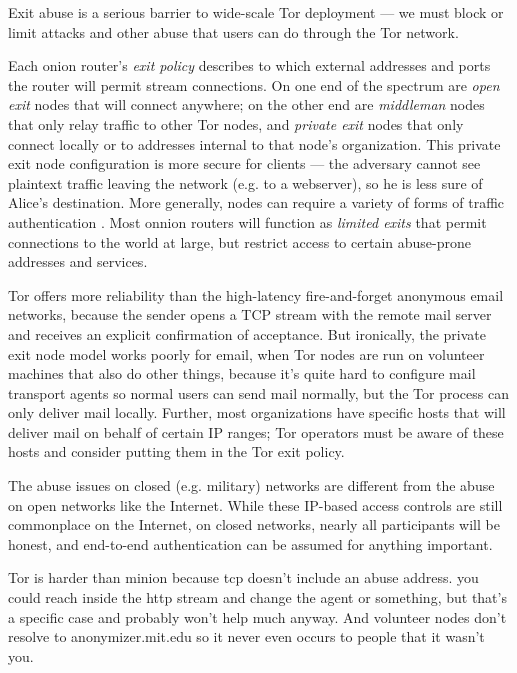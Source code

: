 \documentclass[times,10pt,twocolumn]{article}
\begin{document}
\label{subsec:exitpolicies}

Exit abuse is a serious barrier to wide-scale Tor deployment --- we
must block or limit attacks and other abuse that users can do through
the Tor network.

Each onion router's \emph{exit policy} describes to which external
addresses and ports the router will permit stream connections. On one end
of the spectrum are \emph{open exit} nodes that will connect anywhere;
on the other end are \emph{middleman} nodes that only relay traffic to
other Tor nodes, and \emph{private exit} nodes that only connect locally
or to addresses internal to that node's organization. 
This private exit
node configuration is more secure for clients --- the adversary cannot
see plaintext traffic leaving the network (e.g. to a webserver), so he
is less sure of Alice's destination. More generally, nodes can require
a variety of forms of traffic authentication \cite{onion-discex00}.
Most onnion routers will function as \emph{limited exits} that permit
connections to the world at large, but restrict access to certain abuse-prone
addresses and services.

Tor offers more reliability than the high-latency fire-and-forget
anonymous email networks, because the sender opens a TCP stream
with the remote mail server and receives an explicit confirmation of
acceptance. But ironically, the private exit node model works poorly for
email, when Tor nodes are run on volunteer machines that also do other
things, because it's quite hard to configure mail transport agents so
normal users can send mail normally, but the Tor process can only deliver
mail locally. Further, most organizations have specific hosts that will
deliver mail on behalf of certain IP ranges; Tor operators must be aware
of these hosts and consider putting them in the Tor exit policy.

The abuse issues on closed (e.g. military) networks are different
from the abuse on open networks like the Internet. While these IP-based
access controls are still commonplace on the Internet, on closed networks,
nearly all participants will be honest, and end-to-end authentication
can be assumed for anything important.

Tor is harder than minion because tcp doesn't include an abuse
address. you could reach inside the http stream and change the agent
or something, but that's a specific case and probably won't help
much anyway.
And volunteer nodes don't resolve to anonymizer.mit.edu so it never
even occurs to people that it wasn't you.
\end{document}
